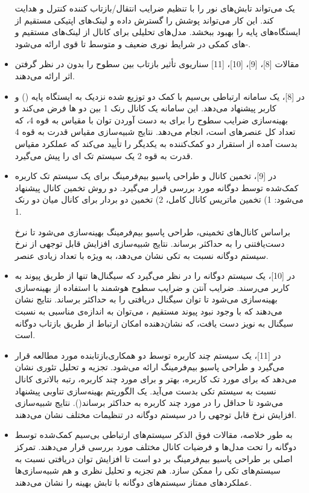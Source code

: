 \begin{itemize}
	یک  می‌تواند تابش‌های نور را با تنظیم ضرایب انتقال/بازتاب کننده کنترل و هدایت کند. این کار می‌تواند پوشش را گسترش داده و لینک‌های اپتیکی مستقیم از ایستگاه‌های پایه را بهبود ببخشد. مدل‌های تحلیلی برای کانال از لینک‌های مستقیم و -های کمکی در شرایط نوری ضعیف و متوسط تا قوی ارائه می‌شود.
	\item 
	مقالات [8]، [9]، [10]، [11] سناریوی تأثیر بازتاب بین سطوح را بدون در نظر گرفتن اثر  ارائه می‌دهند.
	\item 
	در [8]، یک سامانه ارتباطی بی‌سیم با کمک دو  توزیع شده نزدیک به ایستگاه پایه () و کاربر پیشنهاد می‌دهد. این سامانه یک کانال  رنک 1 بین دو ‌ها فرض می‌کند و بهینه‌سازی ضرایب سطوح را برای به دست آوردن توان با مقیاس  به قوه 4، که  تعداد کل عنصر‌های  است، انجام می‌دهد. نتایج شبیه‌سازی مقیاس قدرت  به قوه 4 بدست آمده از استقرار دو  کمک‌کننده به یکدیگر را تأیید می‌کند که عملکرد مقیاس قدرت  به قوه 2 یک سیستم تک  ای را پیش می‌گیرد.
	\item 
	در [9]، تخمین کانال و طراحی پاسیو بیم‌فرمینگ برای یک سیستم تک کاربره کمک‌شده توسط  دوگانه مورد بررسی قرار می‌گیرد. دو روش تخمین کانال پیشنهاد می‌شود: 1) تخمین ماتریس کانال کامل، 2) تخمین دو بردار برای کانال میان دو  رنک 1. 
	
براساس کانال‌های تخمینی، طراحی پاسیو بیم‌فرمینگ بهینه‌سازی می‌شود تا نرخ دست‌یافتنی را به حداکثر برساند. نتایج شبیه‌سازی افزایش قابل توجهی از نرخ سیستم  دوگانه نسبت به  تکی نشان می‌دهد، به ویژه با تعداد زیادی عنصر.
	\item 
	در [10]، یک سیستم  دوگانه را در نظر می‌گیرد که سیگنال‌ها تنها از طریق پیوند  به کاربر می‌رسند. ضرایب آنتن و ضرایب سطوح هوشمند با استفاده از بهینه‌سازی  بهینه‌سازی می‌شود تا توان سیگنال دریافتی را به حداکثر برساند. نتایج نشان می‌دهند که با وجود نبود پیوند مستقیم ، می‌توان به اندازه‌ی مناسبی به نسبت سیگنال به نویز دست یافت، که نشان‌دهنده امکان ارتباط از طریق بازتاب دوگانه  است.
	\item 
	در [11]، یک سیستم  چند کاربره توسط دو  همکاری‌بازتابنده مورد مطالعه قرار می‌گیرد و طراحی پاسیو بیم‌فرمینگ ارائه می‌شود. تجزیه و تحلیل تئوری نشان می‌دهد که برای مورد تک کاربره،  بهتر و برای مورد چند کاربره، رتبه بالاتری کانال نسبت به سیستم  تکی بدست می‌آید. یک الگوریتم بهینه‌سازی تناوبی  پیشنهاد می‌شود تا حداقل  را در مورد چند کاربره به حداکثر برساند(). نتایج شبیه‌سازی افزایش نرخ قابل توجهی را در سیستم  دوگانه در تنظیمات مختلف نشان می‌دهند.
	\item 
	به طور خلاصه، مقالات فوق الذکر سیستم‌های ارتباطی بی‌سیم کمک‌شده توسط  دوگانه را تحت مدل‌ها و فرضیات کانال مختلف مورد بررسی قرار می‌دهند. تمرکز اصلی بر طراحی پاسیو بیم‌فرمینگ بر دو  است تا افزایش توان دریافتی نسبت به سیستم‌های  تکی را ممکن سازد. هم تجزیه و تحلیل نظری و هم شبیه‌سازی‌ها عملکردهای ممتاز سیستم‌های  دوگانه با تابش بهینه را نشان می‌دهند.
	
\end{itemize}

